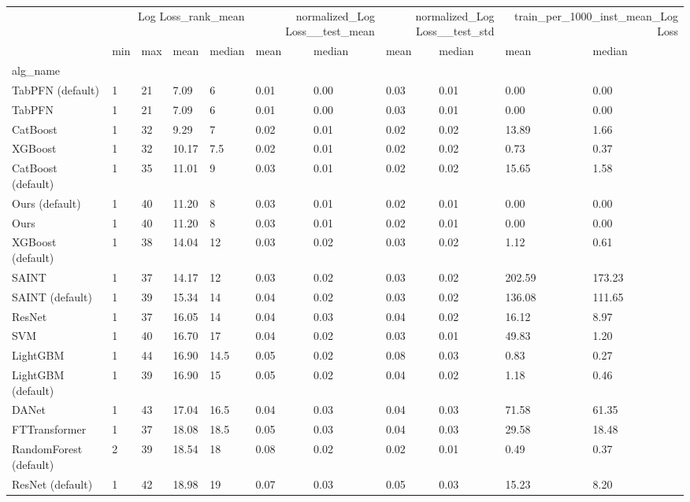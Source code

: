 \begin{tabular}{lllllllllll}
\toprule
 & \multicolumn{4}{r}{Log Loss_rank_mean} & \multicolumn{2}{r}{normalized_Log Loss__test_mean} & \multicolumn{2}{r}{normalized_Log Loss__test_std} & \multicolumn{2}{r}{train_per_1000_inst_mean_Log Loss} \\
 & min & max & mean & median & mean & median & mean & median & mean & median \\
alg_name &  &  &  &  &  &  &  &  &  &  \\
\midrule
TabPFN (default) & 1 & 21 & 7.09 & 6 & 0.01 & 0.00 & 0.03 & 0.01 & 0.00 & 0.00 \\
TabPFN & 1 & 21 & 7.09 & 6 & 0.01 & 0.00 & 0.03 & 0.01 & 0.00 & 0.00 \\
CatBoost & 1 & 32 & 9.29 & 7 & 0.02 & 0.01 & 0.02 & 0.02 & 13.89 & 1.66 \\
XGBoost & 1 & 32 & 10.17 & 7.5 & 0.02 & 0.01 & 0.02 & 0.02 & 0.73 & 0.37 \\
CatBoost (default) & 1 & 35 & 11.01 & 9 & 0.03 & 0.01 & 0.02 & 0.02 & 15.65 & 1.58 \\
Ours (default) & 1 & 40 & 11.20 & 8 & 0.03 & 0.01 & 0.02 & 0.01 & 0.00 & 0.00 \\
Ours & 1 & 40 & 11.20 & 8 & 0.03 & 0.01 & 0.02 & 0.01 & 0.00 & 0.00 \\
XGBoost (default) & 1 & 38 & 14.04 & 12 & 0.03 & 0.02 & 0.03 & 0.02 & 1.12 & 0.61 \\
SAINT & 1 & 37 & 14.17 & 12 & 0.03 & 0.02 & 0.03 & 0.02 & 202.59 & 173.23 \\
SAINT (default) & 1 & 39 & 15.34 & 14 & 0.04 & 0.02 & 0.03 & 0.02 & 136.08 & 111.65 \\
ResNet & 1 & 37 & 16.05 & 14 & 0.04 & 0.03 & 0.04 & 0.02 & 16.12 & 8.97 \\
SVM & 1 & 40 & 16.70 & 17 & 0.04 & 0.02 & 0.03 & 0.01 & 49.83 & 1.20 \\
LightGBM & 1 & 44 & 16.90 & 14.5 & 0.05 & 0.02 & 0.08 & 0.03 & 0.83 & 0.27 \\
LightGBM (default) & 1 & 39 & 16.90 & 15 & 0.05 & 0.02 & 0.04 & 0.02 & 1.18 & 0.46 \\
DANet & 1 & 43 & 17.04 & 16.5 & 0.04 & 0.03 & 0.04 & 0.03 & 71.58 & 61.35 \\
FTTransformer & 1 & 37 & 18.08 & 18.5 & 0.05 & 0.03 & 0.04 & 0.03 & 29.58 & 18.48 \\
RandomForest (default) & 2 & 39 & 18.54 & 18 & 0.08 & 0.02 & 0.02 & 0.01 & 0.49 & 0.37 \\
ResNet (default) & 1 & 42 & 18.98 & 19 & 0.07 & 0.03 & 0.05 & 0.03 & 15.23 & 8.20 \\

\end{tabular}
